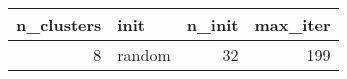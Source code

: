 \begin{tabular}{rlrr}
\toprule
n_clusters & init & n_init & max_iter \\
\midrule
8 & random & 32 & 199 \\
\bottomrule
\end{tabular}
